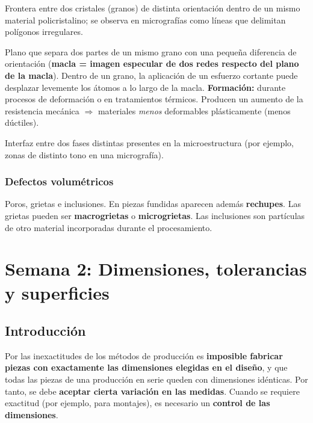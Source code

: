 \documentclass[12pt,a4paper]{article}
\begin{document}
\begin{description}[leftmargin=0pt,style=nextline]
	\item[1. Borde o límite de grano] Frontera entre dos cristales (granos) de
	      distinta orientación dentro de un mismo material policristalino; se
	      observa en
	      micrografías como líneas que delimitan polígonos irregulares.
	\item[2. Planos de macla] Plano que separa dos partes de un mismo grano con
	      una pequeña diferencia de orientación (\textbf{macla = imagen especular
		      de dos
		      redes respecto del plano de la macla}). Dentro de un grano, la
	      aplicación de un
	      esfuerzo cortante puede desplazar levemente los átomos a lo largo de la
	      macla.
	      \textbf{Formación:} durante procesos de deformación o en tratamientos
	      térmicos.
	      Producen un aumento de la resistencia mecánica $\Rightarrow$ materiales
	      \emph{menos} deformables plásticamente (menos dúctiles).
	\item[3. Límites de fase] Interfaz entre dos fases distintas presentes en la
	      microestructura (por ejemplo, zonas de distinto tono en una
	      micrografía).
\end{description}

\subsubsection{Defectos volumétricos}
Poros, grietas e inclusiones. En piezas fundidas aparecen además
\textbf{rechupes}. Las grietas pueden ser \textbf{macrogrietas} o
\textbf{microgrietas}. Las inclusiones son partículas de otro material
incorporadas durante el procesamiento.

\newpage

\section{Semana 2: Dimensiones, tolerancias y superficies}

\subsection{Introducción}
Por las inexactitudes de los métodos de producción es \textbf{imposible fabricar
	piezas con exactamente las dimensiones elegidas en el diseño}, y que todas las
piezas de una producción en serie queden con dimensiones idénticas. Por tanto,
se debe \textbf{aceptar cierta variación en las medidas}. Cuando se requiere
exactitud (por ejemplo, para montajes), es necesario un \textbf{control de las
	dimensiones}.
\end{document}
